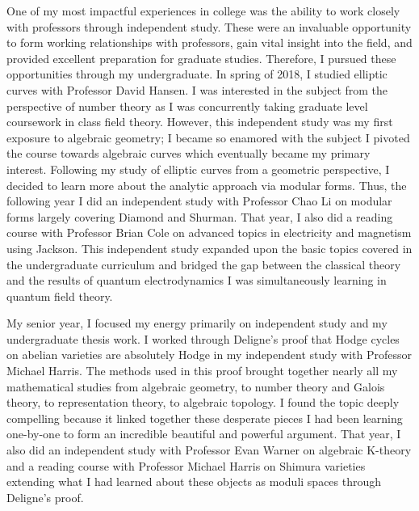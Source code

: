 \documentclass[11pt]{amsart}
\begin{document}
\par
One of my most impactful experiences in college was the ability to work closely with professors through independent study. These were an invaluable opportunity to form working relationships with professors, gain vital insight into the field, and provided excellent preparation for graduate studies. Therefore, I pursued these opportunities through my undergraduate. In spring of 2018, I studied elliptic curves with Professor David Hansen. I was interested in the subject from the perspective of number theory as I was concurrently taking graduate level coursework in class field theory. However, this independent study was my first exposure to algebraic geometry; I became so enamored with the subject I pivoted the course towards algebraic curves which eventually became my primary interest. Following my study of elliptic curves from a geometric perspective, I decided to learn more about the analytic approach via modular forms. Thus, the following year I did an independent study with Professor Chao Li on modular forms largely covering Diamond and Shurman. That year, I also did a reading course with Professor Brian Cole on advanced topics in electricity and magnetism using Jackson. This independent study expanded upon the basic topics covered in the undergraduate curriculum and bridged the gap between the classical theory and the results of quantum electrodynamics I was simultaneously learning in quantum field theory. 
\par
My senior year, I focused my energy primarily on independent study and my undergraduate thesis work. I worked through Deligne's proof that Hodge cycles on abelian varieties are absolutely Hodge in my independent study with Professor Michael Harris. The methods used in this proof brought together nearly all my mathematical studies from algebraic geometry, to number theory and Galois theory, to representation theory, to algebraic topology. I found the topic deeply compelling because it linked together these desperate pieces I had been learning one-by-one to form an incredible beautiful and powerful argument. That year, I also did an independent study with Professor Evan Warner on algebraic K-theory and a reading course with Professor Michael Harris on Shimura varieties extending what I had learned about these objects as moduli spaces through Deligne's proof.
\par
\end{document}
